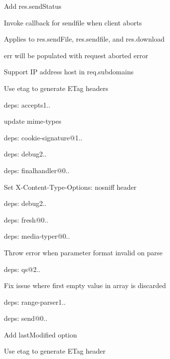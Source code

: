 {\ttfamily 
\begin{DoxyItemize}
\item Add {\ttfamily res.\+send\+Status}
\item Invoke callback for sendfile when client aborts
\begin{DoxyItemize}
\item Applies to {\ttfamily res.\+send\+File}, {\ttfamily res.\+sendfile}, and {\ttfamily res.\+download}
\item {\ttfamily err} will be populated with request aborted error
\end{DoxyItemize}
\item Support IP address host in {\ttfamily req.\+subdomains}
\item Use {\ttfamily etag} to generate {\ttfamily E\+Tag} headers
\item deps\+: accepts1..
\begin{DoxyItemize}
\item update {\ttfamily mime-\/types}
\end{DoxyItemize}
\item deps\+: cookie-\/signature@1..
\item deps\+: debug2..
\item deps\+: finalhandler@0..
\begin{DoxyItemize}
\item Set {\ttfamily X-\/\+Content-\/\+Type-\/\+Options\+: nosniff} header
\item deps\+: debug2..
\end{DoxyItemize}
\item deps\+: fresh@0..
\item deps\+: media-\/typer@0..
\begin{DoxyItemize}
\item Throw error when parameter format invalid on parse
\end{DoxyItemize}
\item deps\+: qs@2..
\begin{DoxyItemize}
\item Fix issue where first empty value in array is discarded
\end{DoxyItemize}
\item deps\+: range-\/parser1..
\item deps\+: send@0..
\begin{DoxyItemize}
\item Add {\ttfamily last\+Modified} option
\item Use {\ttfamily etag} to generate {\ttfamily E\+Tag} header

\end{DoxyItemize}
\end{DoxyItemize}}
